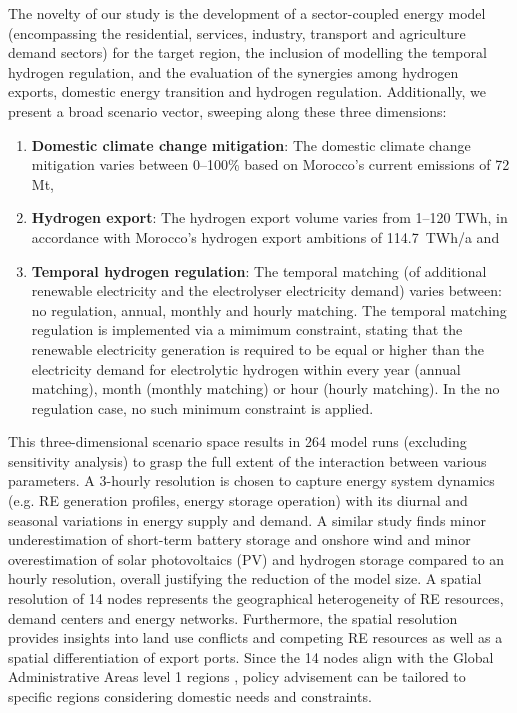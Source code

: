 The novelty of our study is the development of a sector-coupled energy model (encompassing the residential, services, industry, transport and agriculture demand sectors) for the target region, the inclusion of modelling the temporal hydrogen regulation, and the evaluation of the synergies among hydrogen exports, domestic energy transition and hydrogen regulation.
Additionally, we present a broad scenario vector, sweeping along these three dimensions:
\begin{enumerate}
    \item \textbf{Domestic climate change mitigation}: The domestic climate change mitigation varies between 0--100\% based on Morocco's current emissions of 72 Mt\coe,
    \item \textbf{Hydrogen export}: The hydrogen export volume varies from 1--120 TWh, in accordance with Morocco's hydrogen export ambitions of 114.7~TWh/a and
    \item \textbf{Temporal hydrogen regulation}: The temporal matching (of additional renewable electricity and the electrolyser electricity demand) varies between: no regulation, annual, monthly and hourly matching. The temporal matching regulation is implemented via a mimimum constraint, stating that the renewable electricity generation is required to be equal or higher than the electricity demand for electrolytic hydrogen within every year (annual matching), month (monthly matching) or hour (hourly matching). In the no regulation case, no such minimum constraint is applied.
\end{enumerate}
This three-dimensional scenario space results in 264 model runs (excluding sensitivity analysis) to grasp the full extent of the interaction between various parameters.
A 3-hourly resolution is chosen to capture energy system dynamics (e.g. RE generation profiles, energy storage operation) with its diurnal and seasonal variations in energy supply and demand. A similar study \cite{Neumann2022} finds minor underestimation of short-term battery storage and onshore wind and minor overestimation of solar photovoltaics (PV) and hydrogen storage compared to an hourly resolution, overall justifying the reduction of the model size. 
A spatial resolution of 14 nodes represents the geographical heterogeneity of RE resources, demand centers and energy networks. Furthermore, the spatial resolution provides insights into land use conflicts and competing RE resources as well as a spatial differentiation of export ports. Since the 14 nodes align with the Global Administrative Areas level 1 regions \cite{gadm2022}, policy advisement can be tailored to specific regions considering domestic needs and constraints.


